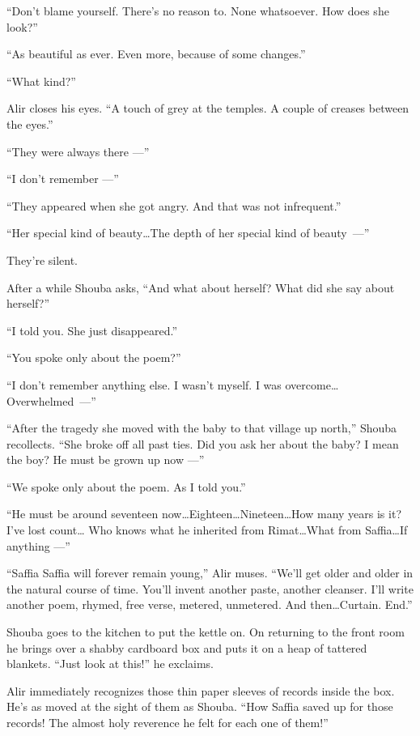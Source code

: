 \documentclass[twoside,11pt,openany]{book}
\begin{document}
``Don't blame yourself. There's no reason to. None whatsoever.  How does she look?''

``As beautiful as ever. Even more, because of some changes.''

``What kind?''

Alir closes his eyes. ``A touch of grey at the temples. A couple of creases between the
eyes.''

``They were always there ---''

``I don't remember ---''

``They appeared when she got angry. And that was not infrequent.''

``Her special kind of beauty{\ldots}The depth of her
special kind of \linebreak[4]beauty~---''

They're silent.

After a while Shouba asks, ``And what about herself? What did she say about herself?''

``I told you. She just disappeared.''

``You spoke only about the poem?''

``I don't remember anything else. I wasn't myself. I was
overcome{\ldots}\linebreak[0]\hbox{Overwhelmed~---''}

``After the tragedy she moved with the baby to that village up north,'' Shouba recollects.
``She broke off all past ties. Did you ask her about the baby? I mean the boy? He must be grown up now ---''

``We spoke only about the poem. As I told you.''

``He must be around seventeen now{\ldots}Eighteen{\ldots}Nineteen{\ldots}How many years is it? I've lost
count{\ldots} Who knows what he inherited from Rimat{\ldots}What from Saffia{\ldots}If anything ---''

``Saffia Saffia will forever remain young,'' Alir muses. ``We'll get older and
older in the natural course of time. You'll invent another paste, another cleanser. I'll write another poem, rhymed,
free verse, metered, unmetered. And then{\ldots}Curtain. End.''

Shouba goes to the kitchen to put the kettle on. On returning to the front room he brings over a shabby cardboard box
and puts it on a heap of tattered blankets. ``Just look at this!'' he exclaims.

Alir immediately recognizes those thin paper sleeves of records inside the box. He's as moved at the sight of them as
Shouba. ``How Saffia saved up for those records! The almost holy reverence he felt for each one of
them!''
\end{document}
